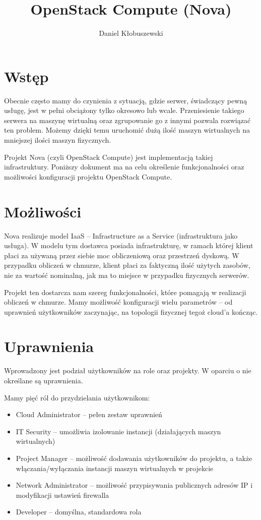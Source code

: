 \documentclass[a4paper,10pt]{article}
\title{OpenStack Compute (Nova)\\[1em]
\large \sc \textls{Opracowanie}}
\author{Daniel Kłobuszewski}
\begin{document}
\maketitle

\section{Wstęp}
Obecnie często mamy do czynienia z sytuacją, gdzie serwer, świadczący pewną usługę, jest w pełni obciążony tylko okresowo lub wcale. Przeniesienie takiego serwera na maszynę wirtualną oraz zgrupowanie go z innymi pozwala rozwiązać ten problem. Możemy dzięki temu uruchomić dużą ilość maszyn wirtualnych na mniejszej ilości maszyn fizycznych.

Projekt Nova (czyli OpenStack Compute) jest implementacją takiej infrastruktury. Poniższy dokument ma na celu określenie funkcjonalności oraz możliwości konfiguracji projektu OpenStack Compute.

\section{Możliwości}
Nova realizuje model IaaS -- Infrastructure as a Service (infrastruktura jako usługa). W modelu tym dostawca posiada infrastrukturę, w ramach której klient płaci za używaną przez siebie moc obliczeniową oraz przestrzeń dyskową. W przypadku obliczeń w chmurze, klient płaci za faktyczną ilość użytych zasobów\cite{yt:prezentacja_od_jana}, nie za wartość nominalną, jak ma to miejsce w przypadku fizycznych serwerów. 

Projekt ten dostarcza nam szereg funkcjonalności, które pomagają w realizacji obliczeń w chmurze. Mamy możliwość konfiguracji wielu parametrów -- od uprawnień użytkowników zaczynając, na topologii fizycznej tegoż cloud'a kończąc.

\section{Uprawnienia}

Wprowadzony jest podział użytkowników na role oraz projekty. W oparciu o nie określane są uprawnienia.

Mamy pięć ról do przydzielania użytkownikom\cite{nova_doc}:

\begin{itemize}
\item Cloud Administrator -- pełen zestaw uprawnień
\item IT Security -- umożliwia izolowanie instancji (działających maszyn wirtualnych)
\item Project Manager -- możliwość dodawania użytkowników do projektu, a także włączania/wyłączania instancji maszyn wirtualnych w projekcie
\item Network Administrator -- możliwość przypisywania publicznych adresów IP i modyfikacji ustawień firewalla
\item Developer -- domyślna, standardowa rola
\end{itemize}
\end{document}
